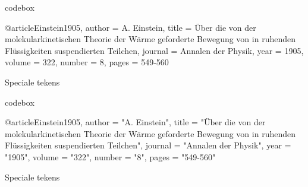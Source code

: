 
\begin{saveblock}{codebox}%
	\begin{highlightblock}
		@article{Einstein1905,
			author = {A. Einstein},
			title = {\"Uber die von der
				molekularkinetischen Theorie der W\"arme
				geforderte Bewegung von in ruhenden
				Fl\"ussigkeiten suspendierten Teilchen},
			journal = {Annalen der Physik},
			year = 1905,
			volume = 322,
			number = 8,
			pages = {549-560}
		}
	\end{highlightblock}
\end{saveblock}

\begin{frame}{Speciale tekens}
	
	\medskip
	
\end{frame}

\begin{saveblock}{codebox}%
	\begin{highlightblock}
		@article{Einstein1905,
			author = "A. Einstein",
			title = "{\"U}ber die von der
				molekularkinetischen Theorie der W{\"a}rme
				geforderte Bewegung von in ruhenden
				Fl{\"u}ssigkeiten suspendierten Teilchen",
			journal = "Annalen der Physik",
			year = "1905",
			volume = "322",
			number = "8",
			pages = "549-560"
		}
	\end{highlightblock}
\end{saveblock}


\begin{frame}{Speciale tekens}
	
	\medskip
	
\end{frame}
